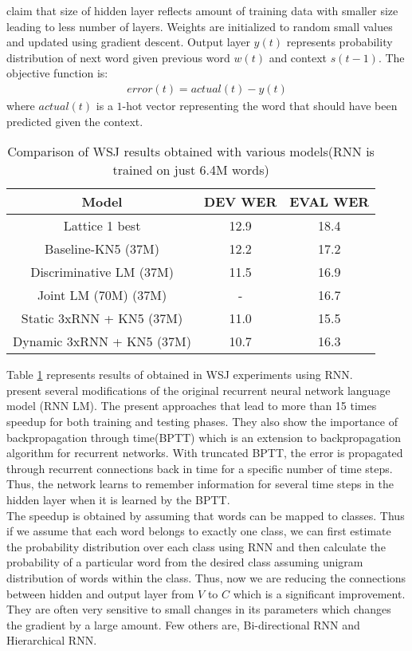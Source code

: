 \cite{Mikolov:10} claim that size of hidden layer reflects amount of training data with smaller size leading to less number of layers. Weights are initialized to random small values and updated using gradient descent. Output layer $y(t)$ represents probability distribution of next word given previous word $w(t)$ and context $s(t-1)$. The objective function is:
\begin{align}
error(t) =  actual(t) - y(t)
\end{align}
where $actual(t)$ is a $1$-hot vector representing the word that should have been predicted given the context.
\begin {table}[h!]
\centering
\begin{tabular}{ |c|c|c| }
\hline
Model & DEV WER & EVAL WER \\ \hline
Lattice 1 best & 12.9 & 18.4 \\ 
Baseline-KN5 (37M) & 12.2 & 17.2 \\
Discriminative LM (37M) & 11.5 & 16.9 \\
Joint LM (70M) (37M) & - & 16.7 \\ \hline
Static 3xRNN + KN5 (37M) & 11.0 & 15.5 \\
Dynamic 3xRNN + KN5 (37M) & 10.7 & 16.3 \\
\hline
\end{tabular}
\caption {Comparison of WSJ results obtained with various models(RNN is trained on just 6.4M words)}
\label{table:rnn}
\end{table}
Table \ref{table:rnn} represents results of \cite{Mikolov:10} obtained in WSJ experiments using RNN.\\

\cite{Mikolov:11} present several modifications of the original recurrent neural network language model (RNN LM). The present approaches that lead to more than 15 times speedup for both training and testing phases. They also show the importance of backpropagation through time(BPTT) which is an extension to backpropagation algorithm for recurrent networks. With truncated BPTT, the error is propagated through recurrent connections back in time for a specific number of time steps. Thus, the network learns to remember information for several time steps in the hidden layer when it is learned by the BPTT.\\
The speedup is obtained by assuming that words can be mapped to classes. Thus if we assume that each word belongs to exactly one class, we can first estimate the probability distribution over each class using RNN and then calculate the probability of a particular word from the desired class assuming unigram distribution of words within the class. Thus, now we are reducing the connections between hidden and output layer from $V$ to $C$ which is a significant improvement.\\
They are often very sensitive to small changes in its parameters which changes the gradient by a large amount. Few others are, Bi-directional RNN and Hierarchical RNN.\\

